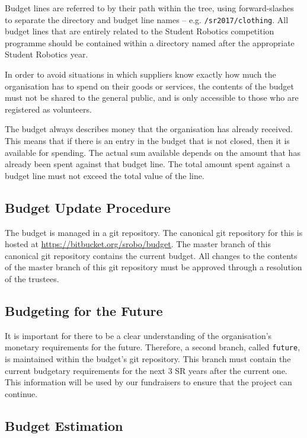 Budget lines are referred to by their path within the tree, using forward-slashes to separate the directory and budget line names -- e.g. \texttt{/sr2017/clothing}.  All budget lines that are entirely related to the Student Robotics competition programme should be contained within a directory named after the appropriate Student Robotics year.

In order to avoid situations in which suppliers know exactly how much the organisation has to spend on their goods or services, the contents of the budget must not be shared to the general public, and is only accessible to those who are registered as volunteers.

The budget always describes money that the organisation has already received.  This means that if there is an entry in the budget that is not closed, then it is available for spending.  The actual sum available depends on the amount that has already been spent against that budget line.  The total amount spent against a budget line must not exceed the total value of the line.

\subsection{Budget Update Procedure}

The budget is managed in a git repository.  The canonical git repository for this is hosted at \url{https://bitbucket.org/srobo/budget}.  The master branch of this canonical git repository contains the current budget.  All changes to the contents of the master branch of this git repository must be approved through a resolution of the trustees.

\subsection{Budgeting for the Future}

It is important for there to be a clear understanding of the organisation's monetary requirements for the future.  Therefore, a second branch, called \texttt{future}, is maintained within the budget's git repository.  This branch must contain the current budgetary requirements for the next 3 SR years after the current one.  This information will be used by our fundraisers to ensure that the project can continue.

\subsection{Budget Estimation}


